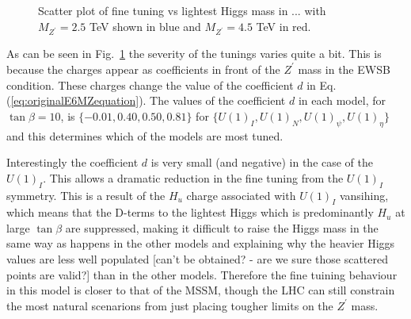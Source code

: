 \documentclass[preprint,amsmath,amssymb,aps,superscriptaddress,prd,showpacs,floatfix,nofootinbib]{revtex4-1}
\begin{document}
\begin{figure}
\begin{center}
\caption{Scatter plot of fine tuning vs lightest Higgs mass in ... with $M_{Z^\prime} = 2.5$ TeV shown in blue and $M_{Z^\prime} = 4.5$ TeV in red.}
\label{Fig:othere6modelsvsmssm}
\end{center}
\end{figure}

As can be seen in Fig.~\ref{Fig:othere6modelsvsmssm} the severity of the tunings varies quite
a bit.  This is because the charges appear as coefficients in front of
the $Z^\prime$ mass in the EWSB condition.  These charges change the
value of the coefficient $d$ in Eq. (\ref{eq:originalE6MZequation}).
The values of the coefficient $d$ in each model, for $\tan\beta = 10$,
is $\{-0.01, 0.40, 0.50, 0.81 \}$ for $\{U(1)_I, U(1)_N, U(1)_\psi,
U(1)_\eta \}$ and this determines which of the models are most tuned.

Interestingly the coefficient $d$ is very small (and negative) in the
case of the $U(1)_I$.  This allows a dramatic reduction in the fine
tuning from the $U(1)_I$ symmetry.  This is a result of the $H_u$
charge associated with $U(1)_I$ vansihing, which means that the
D-terms to the lightest Higgs which is predominantly $H_u$ at large
$\tan \beta$ are suppressed, making it difficult to raise the Higgs
mass in the same way as happens in the other models and explaining why
the heavier Higgs values are less well populated [can't be obtained? -
are we sure those scattered points are valid?]  than in the other
models.  Therefore the fine tuining behaviour in this model is closer
to that of the MSSM, though the LHC can still constrain the most
natural scenarions from just placing tougher limits on the $Z^\prime$
mass.
\end{document}

